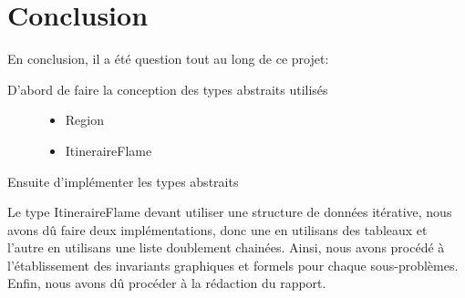 \section{Conclusion}\label{conclusion}

En conclusion, il a été question tout au long de ce projet:
\begin{description}
    \item[D'abord de faire la conception des types abstraits utilisés]
    \indent
    \begin{itemize}
        \item Region
        \item ItineraireFlame
    \end{itemize}
    \item[Ensuite d'implémenter les types abstraits]  
\end{description}

Le type ItineraireFlame devant utiliser une structure de données itérative, nous avons dû
faire deux implémentations, donc une en utilisans des tableaux et l'autre en utilisans une liste
doublement chainées.
\newline
\quad Ainsi, nous avons procédé à l'établissement des invariants graphiques et formels pour chaque 
sous-problèmes.
\newline
\quad Enfin, nous avons dû procéder à la rédaction du rapport.
